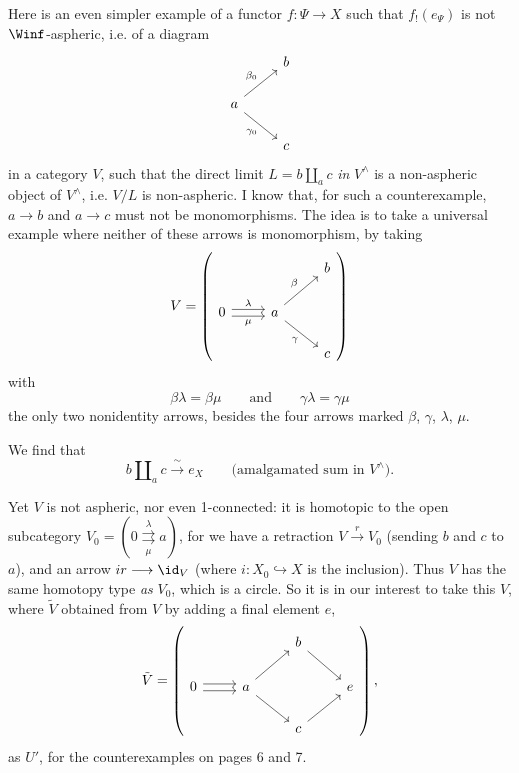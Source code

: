Here is an even simpler example of a functor $f : \Psi \longrightarrow X$ such that $f_!(e_{\Psi})$ is not $\Winf$-aspheric, i.e. of a diagram
\[
\begin{tikzcd}
& b \\
a \arrow[ur, "\beta_0"] \arrow[dr, "\gamma_0"'] & \\
& c
\end{tikzcd}
\]
in a category $V$, such that the direct limit $L = b \amalg_a c$ \textit{in} $V^{\wedge}$ is a non-aspheric object of $V^{\wedge}$, i.e. $V/L$ is non-aspheric. I know that, for such a counterexample, $a \longrightarrow b$ and $a \longrightarrow c$ must not be monomorphisms. The idea is to take a universal example where neither of these arrows is monomorphism, by taking
\[
V = \left(
\begin{tikzcd}
& & b \\
0 \arrow[r, shift left, "\lambda"] \arrow[r, shift right, "\mu"'] & a \arrow[ur, "\beta"] \arrow[dr, "\gamma"'] & \\
& & c
\end{tikzcd}
\right)
\]
with
\[ \beta\lambda = \beta\mu \qquad \text{and} \qquad \gamma\lambda = \gamma\mu \]
the only two nonidentity arrows, besides the four arrows marked $\beta$, $\gamma$, $\lambda$, $\mu$.

We find that
\[ b \amalg_a c \xrightarrow{\ \sim\ } e_X \qquad \text{(amalgamated sum in } V^{\wedge}\text{).} \] %

Yet $V$ is not aspheric, nor even 1-connected: it is homotopic to the open subcategory $V_0 = (0 \overset{\lambda}{\underset{\mu}{\rightrightarrows}} a)$, for we have a retraction $V \xrightarrow{\ r\ } V_0$ (sending $b$ and $c$ to $a$), and an arrow $ir \longrightarrow \id_V$ (where $i : X_0 \hookrightarrow X$ is the inclusion). Thus $V$ has the same homotopy type \textit{as} $V_0$, which is a circle. So it is in our interest to take this $V$, where $\tilde{V}$ obtained from $V$ by adding a final element $e$, %
\[
\tilde{V} = \left(
\begin{tikzcd}
& & b \arrow[dr] & \\
0 \arrow[r, shift left] \arrow[r, shift right] & a \arrow[ur] \arrow[dr] & & e \\
& & c \arrow[ur] &
\end{tikzcd}
\right),
\]
as $U'$, for the counterexamples on pages 6 and 7.

